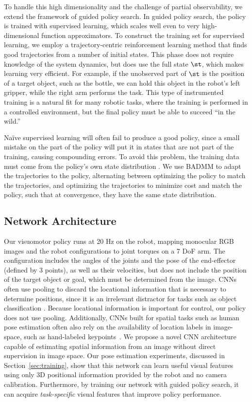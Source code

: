 \documentclass[conference]{IEEEtran}
\begin{document}
To handle this high dimensionality and the challenge of partial observability, we extend the framework of guided policy search. In guided policy search, the policy is trained with supervised learning, which scales well even to very high-dimensional function approximators. To construct the training set for supervised learning, we employ a trajectory-centric reinforcement learning method that finds good trajectories from a number of initial states. This phase does not require knowledge of the system dynamics, but does use the full state $\st$, which makes learning very efficient. For example, if the unobserved part of $\st$ is the position of a target object, such as the bottle, we can hold this object in the robot's left gripper, while the right arm performs the task. This type of instrumented training is a natural fit for many robotic tasks, where the training is performed in a controlled environment, but the final policy must be able to succeed ``in the wild.''

Na\"{i}ve supervised learning will often fail to produce a good policy, since a small mistake on the part of the policy will put it in states that are not part of the training, causing compounding errors. To avoid this problem, the training data must come from the policy's own state distribution \cite{rgb-rilsp-11}. We use BADMM \cite{wb-badmm-14} to adapt the trajectories to the policy, alternating between optimizing the policy to match the trajectories, and optimizing the trajectories to minimize cost and match the policy, such that at convergence, they have the same state distribution.


\subsection{Network Architecture}
\label{sec:policyarch}

Our visuomotor policy runs at 20 Hz on the robot, mapping monocular RGB images and the robot configurations to joint torques on a 7 DoF arm. The configuration includes the angles of the joints and the pose of the end-effector (defined by 3 points), as well as their velocities, but does not include the position of the target object or goal, which must be determined from the image. CNNs often use pooling to discard the locational information that is necessary to determine positions, since it is an irrelevant distractor for tasks such as object classification \cite{lgrn-cdbn-09}. Because locational information is important for control, our policy does not use pooling. Additionally, CNNs built for spatial tasks such as human pose estimation often also rely on the availability of location labels in image-space, such as hand-labeled keypoints~\cite{tjlb-jcngm-14}. We propose a novel CNN architecture capable of estimating spatial information from an image without direct supervision in image space. Our pose estimation experiments, discussed in Section~\ref{sec:training}, show that this network can learn useful visual features using only 3D positional information provided by the robot and no camera calibration. Furthermore, by training our network with guided policy search, it can acquire \emph{task-specific} visual features that improve policy performance.
\end{document}

